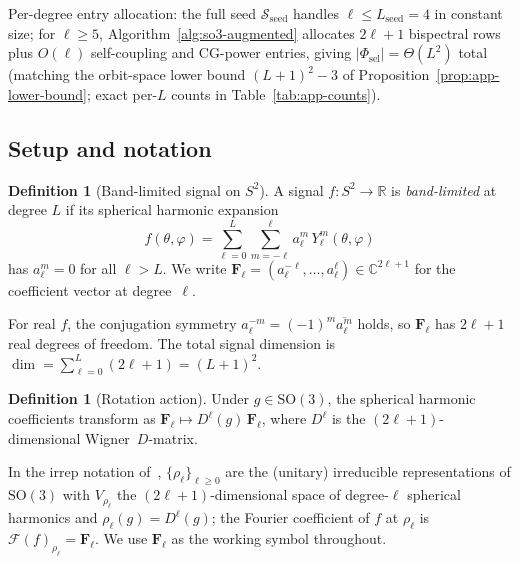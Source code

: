 \documentclass{article}
\theoremstyle{definition}
\newtheorem{definition}[theorem]{Definition}
\theoremstyle{remark}
\newcommand{\R}{\mathbb{R}}
\newcommand{\C}{\mathbb{C}}
\newcommand{\SO}{\mathrm{SO}}
\newcommand{\SH}{Y}
\newcommand{\conj}[1]{\overline{#1}}
\theoremstyle{definition}
\begin{document}
Per-degree entry allocation: the full seed
$\mathcal{S}_{\mathrm{seed}}$ handles $\ell\le L_{\mathrm{seed}}=4$
in constant size; for $\ell\ge 5$, Algorithm~\ref{alg:so3-augmented}
allocates $2\ell{+}1$ bispectral rows plus $O(\ell)$
self-coupling and CG-power entries, giving
$|\Phi_{\mathrm{sel}}|=\Theta(L^2)$ total (matching the orbit-space
lower bound $(L{+}1)^2-3$ of
Proposition~\ref{prop:app-lower-bound}; exact per-$L$ counts in
Table~\ref{tab:app-counts}).

\subsection{Setup and notation}
\label{sec:app-setup}

\begin{definition}[Band-limited signal on $S^2$]
A signal $f : S^2 \to \R$ is \emph{band-limited} at degree $L$ if its
spherical harmonic expansion
\begin{equation}\label{eq:app-sh-expansion}
  f(\theta, \varphi)
  = \sum_{\ell=0}^{L} \sum_{m=-\ell}^{\ell}
    a_\ell^m \, \SH_\ell^m(\theta, \varphi)
\end{equation}
has $a_\ell^m = 0$ for all $\ell > L$. We write
$\mathbf{F}_\ell = (a_\ell^{-\ell}, \dotsc, a_\ell^{\ell})
  \in \C^{2\ell+1}$
for the coefficient vector at degree~$\ell$.
\end{definition}

\noindent
For real $f$, the conjugation symmetry
$a_\ell^{-m} = (-1)^m \conj{a_\ell^m}$ holds, so
$\mathbf{F}_\ell$ has $2\ell+1$ real degrees of freedom.
The total signal dimension is
$\dim = \sum_{\ell=0}^{L}(2\ell+1) = (L+1)^2$.

\begin{definition}[Rotation action]
Under $g \in \SO(3)$, the spherical harmonic coefficients transform as
$\mathbf{F}_\ell \mapsto D^\ell(g)\,\mathbf{F}_\ell$,
where $D^\ell$ is the $(2\ell+1)$-dimensional Wigner~$D$-matrix.
\end{definition}

\noindent
In the irrep notation of~\citet{mataigne2024selective},
$\{\rho_\ell\}_{\ell\ge 0}$ are the (unitary) irreducible
representations of $\SO(3)$ with $V_{\rho_\ell}$ the
$(2\ell{+}1)$-dimensional space of degree-$\ell$ spherical harmonics
and $\rho_\ell(g)=D^\ell(g)$; the Fourier coefficient of $f$ at
$\rho_\ell$ is $\mathcal{F}(f)_{\rho_\ell}=\mathbf{F}_\ell$. We use
$\mathbf{F}_\ell$ as the working symbol throughout.
\end{document}
